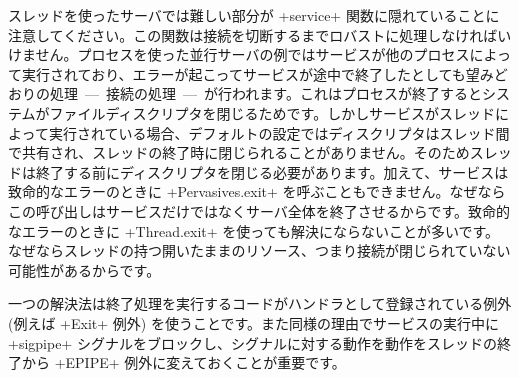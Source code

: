 スレッドを使ったサーバでは難しい部分が \ml+service+ 関数に隠れていることに注意してください。この関数は接続を切断するまでロバストに処理しなければいけません。プロセスを使った並行サーバの例ではサービスが他のプロセスによって実行されており、エラーが起こってサービスが途中で終了したとしても望みどおりの処理~---~接続の処理~---~が行われます。これはプロセスが終了するとシステムがファイルディスクリプタを閉じるためです。しかしサービスがスレッドによって実行されている場合、デフォルトの設定ではディスクリプタはスレッド間で共有され、スレッドの終了時に閉じられることがありません。そのためスレッドは終了する前にディスクリプタを閉じる必要があります。加えて、サービスは致命的なエラーのときに \ml+Pervasives.exit+ を呼ぶこともできません。なぜならこの呼び出しはサービスだけではなくサーバ全体を終了させるからです。致命的なエラーのときに \ml+Thread.exit+ を使っても解決にならないことが多いです。なぜならスレッドの持つ開いたままのリソース、つまり接続が閉じられていない可能性があるからです。

一つの解決法は終了処理を実行するコードがハンドラとして登録されている例外 (例えば \ml+Exit+ 例外) を使うことです。また同様の理由でサービスの実行中に \ml+sigpipe+ シグナルをブロックし、シグナルに対する動作を動作をスレッドの終了から \ml+EPIPE+ 例外に変えておくことが重要です。


